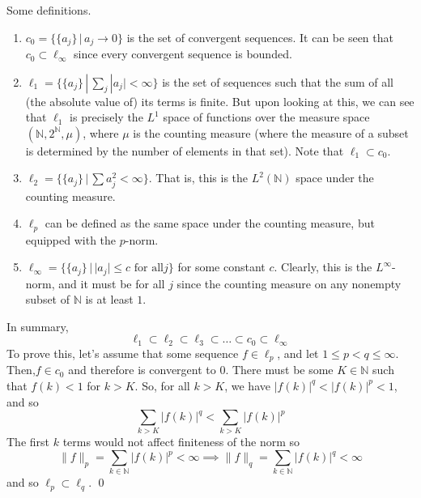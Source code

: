 	Some definitions. 
	\begin{enumerate}
		\item $c_0 = \big\{ \{a_j\} \,|\, a_j \rightarrow 0 \big\}$ is the set of convergent sequences. It can be seen that $c_0 \subset \ell_\infty$ since every convergent sequence is bounded. 
		\item $\ell_1 = \big\{ \{a_j\} \,|\, \sum_j |a_j| < \infty\}$ is the set of sequences such that the sum of all (the absolute value of) its terms is finite. But upon looking at this, we can see that $\ell_1$ is precisely the $L^1$ space of functions over the measure space $(\mathbb{N}, 2^\mathbb{N}, \mu)$, where $\mu$ is the counting measure (where the measure of a subset is determined by the number of elements in that set). Note that $\ell_1 \subset c_0$. 
		\item $\ell_2 = \big\{ \{a_j\} \,|\, \sum a_j^2 < \infty \big\}$. That is, this is the $L^2 (\mathbb{N})$ space under the counting measure. 
		\item $\ell_p$ can be defined as the same space under the counting measure, but equipped with the $p$-norm. 
		\item $\ell_\infty = \big\{ \{ a_j \} \,|\, |a_j| \leq c \text{ for all} j \big\}$ for some constant $c$. Clearly, this is the $L^\infty$-norm, and it must be for all $j$ since the counting measure on any nonempty subset of $\mathbb{N}$ is at least $1$.  
	\end{enumerate}
	In summary, 
	\begin{equation}
	  \ell_1 \subset \ell_2 \subset \ell_3 \subset \ldots \subset c_0 \subset \ell_\infty
	\end{equation}
	To prove this, let's assume that some sequence $f \in \ell_p$, and let $1 \leq p < q \leq \infty$. Then,$f \in c_0$ and therefore is convergent to $0$. There must be some $K \in \mathbb{N}$ such that $f(k) < 1$ for $k > K$. So, for all $k > K$, we have $|f(k)|^q < |f(k)|^p < 1$, and so 
	\begin{equation}
	  \sum_{k > K} |f(k)|^q < \sum_{k > K} |f(k)|^p
	\end{equation}
	The first $k$ terms would not affect finiteness of the norm so 
	\begin{equation}
	  \|f\|_p = \sum_{k \in \mathbb{N}} |f(k)|^p < \infty \implies \|f\|_q = \sum_{k \in \mathbb{N}} |f(k)|^q < \infty
	\end{equation}
	and so $\ell_p \subset \ell_q$. \qed

